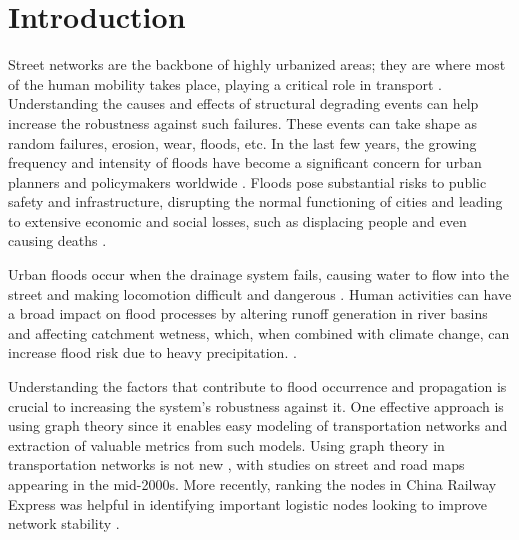 \documentclass[sn-nature]{sn-jnl}%
\theoremstyle{thmstyleone}%
\theoremstyle{thmstyletwo}%
\theoremstyle{thmstylethree}%
\begin{document}

\maketitle

\section{Introduction}\label{sec1}

Street networks are the backbone of highly urbanized areas; they are where most of the human mobility takes place, playing a critical role in transport \cite{yuan2023predicting}. Understanding the causes and effects of structural degrading events can help increase the robustness against such failures. These events can take shape as random failures, erosion, wear, floods, etc.
In the last few years, the growing frequency and intensity of floods have become a significant concern for urban planners and policymakers worldwide \cite{Zare2018}.
Floods pose substantial risks to public safety and infrastructure, disrupting the normal functioning of cities and leading to extensive economic and social losses, such as displacing people and even causing deaths \cite{Pregnolato2017, ye2021towards}.

Urban floods occur when the drainage system fails, causing water to flow into the street and making locomotion difficult and dangerous \cite{Tomas2022}.
Human activities can have a broad impact on flood processes by altering runoff generation in river basins and affecting catchment wetness, which, when combined with climate change, can increase flood risk due to heavy precipitation. \cite{Merz2021}.

Understanding the factors that contribute to flood occurrence and propagation is crucial to increasing the system's robustness against it. One effective approach is using graph theory since it enables easy modeling of transportation networks and extraction of valuable metrics from such models.
Using graph theory in transportation networks is not new \cite{Aez1996}, with studies on street and road maps appearing in the mid-2000s\cite{Porta2006, Jenelius2006}.
More recently, ranking the nodes in China Railway Express was helpful in identifying important logistic nodes looking to improve network stability \cite{Zhang2020}.
\end{document}
